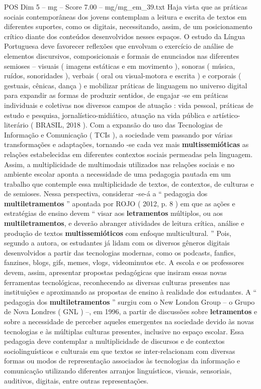 \begin{textsample}{POS Dim 5 – mg – Score 7.00 – mg/mg\_em\_39.txt}
Haja vista que as práticas sociais contemporâneas dos jovens contemplam a leitura e escrita de textos em diferentes suportes, como os digitais, necessitando, assim, de um posicionamento crítico diante dos conteúdos desenvolvidos nesses espaços.
O estudo da Língua Portuguesa deve favorecer reflexões que envolvam o exercício de análise de elementos discursivos, composicionais e formais de enunciados nas diferentes semioses – visuais ( imagens estáticas e em movimento ), sonoras ( música, ruídos, sonoridades ), verbais ( oral ou visual-motora e escrita ) e corporais ( gestuais, cênicas, dança ) e mobilizar práticas de linguagem no universo digital para expandir as formas de produzir sentidos, de engajar -se em práticas individuais e coletivas nos diversos campos de atuação : vida pessoal, práticas de estudo e pesquisa, jornalístico-midiático, atuação na vida pública e artístico-literário ( BRASIL, 2018 ).
Com a expansão do uso das Tecnologias de Informação e Comunicação ( TCIs ), a sociedade vem passando por várias transformações e adaptações, tornando -se cada vez mais \textbf{multissemióticas} as relações estabelecidas em diferentes contextos sociais permeadas pela linguagem.
Assim, a multiplicidade de multimodais utilizados nas relações sociais e no ambiente escolar aponta a necessidade de uma pedagogia pautada em um trabalho que contemple essa multiplicidade de textos, de contextos, de culturas e de semioses.
Nessa perspectiva, considerar -se-á a “ pedagogia dos \textbf{multiletramentos} ” apontada por ROJO ( 2012, p. 8 ) em que as ações e estratégias de ensino devem “ visar aos \textbf{letramentos} múltiplos, ou aos \textbf{multiletramentos}, e deverão abranger atividades de leitura crítica, análise e produção de textos \textbf{multissemióticos} com enfoque multicultural. ” Pois, segundo a autora, os estudantes já lidam com os diversos gêneros digitais desenvolvidos a partir das tecnologias modernas, como os podcasts, fanfics, fanzines, blogs, gifs, memes, vlogs, videominutos etc.
A escola e os professores devem, assim, apresentar propostas pedagógicas que insiram essas novas ferramentas tecnológicas, reconhecendo as diversas culturas presentes nas instituições e aproximando as propostas de ensino à realidade dos estudantes.
A “ pedagogia dos \textbf{multiletramentos} ” surgiu com o New London Group – o Grupo de Nova Londres ( GNL ) –, em 1996, a partir de discussões sobre \textbf{letramentos} e sobre a necessidade de perceber aqueles emergentes na sociedade devido às novas tecnologias e às múltiplas culturas presentes, inclusive no espaço escolar.
Essa pedagogia deve contemplar a multiplicidade de discursos e de contextos sociolinguísticos e culturais em que textos se inter-relacionam com diversas formas ou modos de representação associados às tecnologias da informação e comunicação utilizando diferentes arranjos linguísticos, visuais, sensoriais, auditivos, digitais, entre outras representações.

\end{textsample}
